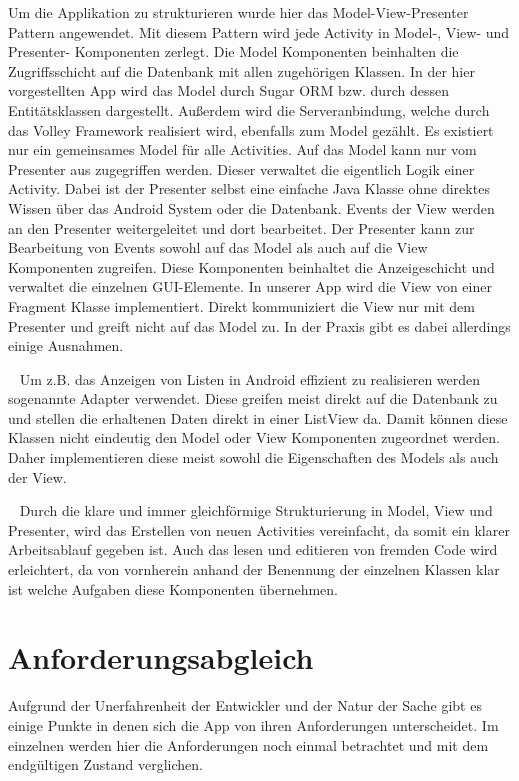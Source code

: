 \documentclass{scrartcl}
\begin{document}
\noindent
Um die Applikation zu strukturieren wurde hier das Model-View-Presenter Pattern
angewendet. Mit diesem Pattern wird jede Activity in Model-, View- und
Presenter- Komponenten zerlegt. Die Model Komponenten beinhalten die
Zugriffsschicht auf die Datenbank mit allen zugehörigen Klassen. In der hier
vorgestellten App wird das Model durch Sugar ORM bzw. durch dessen
Entitätsklassen dargestellt. Außerdem wird die Serveranbindung, welche durch das
Volley Framework realisiert wird, ebenfalls zum Model gezählt. Es existiert
nur ein gemeinsames Model für alle Activities. Auf das Model kann nur vom
Presenter aus zugegriffen werden. Dieser verwaltet die
eigentlich Logik einer Activity. Dabei ist der Presenter selbst eine einfache
Java Klasse ohne direktes Wissen über das Android System oder die Datenbank.
Events der View werden an den Presenter weitergeleitet und dort bearbeitet. Der
Presenter kann zur Bearbeitung von Events sowohl auf das Model als auch auf die
View Komponenten zugreifen. Diese Komponenten beinhaltet die Anzeigeschicht und
verwaltet die einzelnen GUI-Elemente. In unserer App wird die View von einer
Fragment Klasse implementiert. Direkt kommuniziert die View nur mit dem
Presenter und greift nicht auf das Model zu. In der Praxis gibt es dabei
allerdings einige Ausnahmen.

\ \newline
Um z.B. das Anzeigen von Listen in Android effizient zu realisieren werden
sogenannte Adapter verwendet. Diese greifen meist direkt auf die Datenbank zu
und stellen die erhaltenen Daten direkt in einer ListView da. Damit können diese
Klassen nicht eindeutig den Model oder View Komponenten zugeordnet werden. Daher
implementieren diese meist sowohl die Eigenschaften des Models als auch der
View.

\ \newline
Durch die klare und immer gleichförmige Strukturierung in Model, View und
Presenter, wird das Erstellen von neuen Activities vereinfacht, da somit ein
klarer Arbeitsablauf gegeben ist. Auch das lesen und editieren von fremden Code
wird erleichtert, da von vornherein anhand der Benennung der einzelnen Klassen
klar ist welche Aufgaben diese Komponenten übernehmen.

\section{Anforderungsabgleich}
Aufgrund der Unerfahrenheit der Entwickler und der Natur der Sache gibt es einige Punkte in denen sich die App von ihren Anforderungen unterscheidet. 
Im einzelnen werden hier die Anforderungen noch einmal betrachtet und mit dem endgültigen Zustand verglichen.
\end{document}
